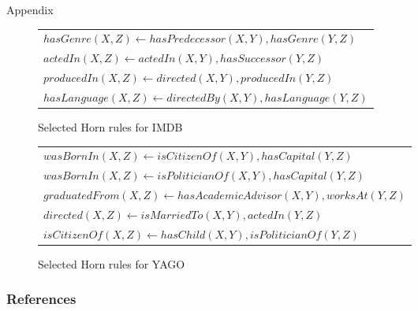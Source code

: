 \documentclass{beamer}
\newcommand{\mi}[1]{\ensuremath{\mathit{#1}}}
\begin{document}
\begin{frame}{Appendix}

\begin{figure}[t]
\centering  
\begin{tabular}{l}
{\scriptsize $\mi{hasGenre(X, Z)}  \leftarrow \mi{hasPredecessor(X, Y)},\mi{hasGenre(Y, Z)}$}\\
{\scriptsize $\mi{actedIn(X, Z)}  \leftarrow \mi{actedIn(X, Y)},\mi{hasSuccessor(Y, Z)}$} \\
{\scriptsize $\mi{producedIn(X, Z)}  \leftarrow \mi{directed(X, Y)}{,}\mi{producedIn(Y, Z)}$} \\
{\scriptsize $\mi{hasLanguage(X, Z)}  \leftarrow \mi{directedBy(X, Y)}{,}\mi{hasLanguage(Y, Z)}$} \\
\end{tabular}
\caption{Selected Horn rules for IMDB}
\label{fig:examplerules}
\end{figure}

\begin{figure}[t]
\centering  
\begin{tabular}{l}
{\scriptsize $\mi{wasBornIn(X, Z)}  \leftarrow \mi{isCitizenOf(X, Y)},\mi{hasCapital(Y, Z)}$}\\
{\scriptsize $\mi{wasBornIn(X, Z)}  \leftarrow \mi{isPoliticianOf(X, Y)},\mi{hasCapital(Y, Z)}$} \\
{\scriptsize $\mi{graduatedFrom(X, Z)}  \leftarrow \mi{hasAcademicAdvisor(X, Y)}{,}\mi{worksAt(Y, Z)}$} \\
{\scriptsize $\mi{directed(X, Z)}  \leftarrow \mi{isMarriedTo(X, Y)}{,}\mi{actedIn(Y, Z)}$} \\
{\scriptsize $\mi{isCitizenOf(X, Z)}  \leftarrow \mi{hasChild(X, Y)}{,}\mi{isPoliticianOf(Y, Z)}$} \\
\end{tabular}
\caption{Selected Horn rules for YAGO}
\label{fig:examplerules}
\end{figure}

\end{frame}

\begin{frame}
  \frametitle{References}
  
 \tiny{}
\end{frame}
\end{document}
